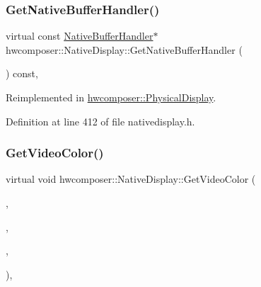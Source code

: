 \subsubsection{\texorpdfstring{Get\+Native\+Buffer\+Handler()}{GetNativeBufferHandler()}}
{\footnotesize\ttfamily virtual const \mbox{\hyperlink{classhwcomposer_1_1NativeBufferHandler}{Native\+Buffer\+Handler}}$\ast$ hwcomposer\+::\+Native\+Display\+::\+Get\+Native\+Buffer\+Handler (\begin{DoxyParamCaption}{ }\end{DoxyParamCaption}) const\hspace{0.3cm}{\ttfamily [inline]}, {\ttfamily [virtual]}}



Reimplemented in \mbox{\hyperlink{classhwcomposer_1_1PhysicalDisplay_ab10ddca2b99e21d8fef188205900d021}{hwcomposer\+::\+Physical\+Display}}.



Definition at line 412 of file nativedisplay.\+h.


\begin{DoxyCode}{0}
\end{DoxyCode}
\mbox{\label{classhwcomposer_1_1NativeDisplay_a2db52a8a234064113a0e250a059663ac}} 
\subsubsection{\texorpdfstring{Get\+Video\+Color()}{GetVideoColor()}}
{\footnotesize\ttfamily virtual void hwcomposer\+::\+Native\+Display\+::\+Get\+Video\+Color (\begin{DoxyParamCaption}\item[{H\+W\+C\+Color\+Control}]{,  }\item[{float $\ast$}]{,  }\item[{float $\ast$}]{,  }\item[{float $\ast$}]{ }\end{DoxyParamCaption})\hspace{0.3cm}{\ttfamily [inline]}, {\ttfamily [virtual]}}

